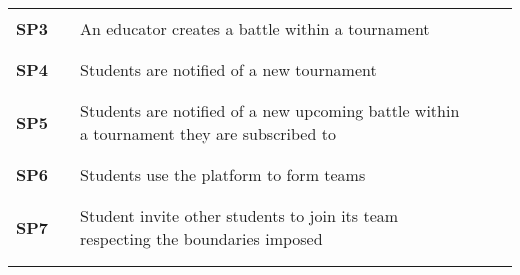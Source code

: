 \begin{longtable}[H]{l l p{8.5cm} l l}
                  &        &                                                                                                          &        &                        \\\hline & & & & \\
    \textbf{SP3}  & \vline & An educator creates a battle within a tournament                                                         & \vline &                        \\
                  &        &                                                                                                          &        &                        \\\hline & & & & \\
    \textbf{SP4}  & \vline & Students are notified of a new tournament                                                                & \vline &                        \\
                  &        &                                                                                                          &        &                        \\\hline & & & & \\
    \textbf{SP5}  & \vline & Students are notified of a new upcoming battle within a tournament they are subscribed to                & \vline &                        \\
                  &        &                                                                                                          &        &                        \\\hline & & & & \\
    \textbf{SP6}  & \vline & Students use the platform to form teams                                                                  & \vline &                        \\
                  &        &                                                                                                          &        &                        \\\hline & & & & \\
    \textbf{SP7}  & \vline & Student invite other students to join its team respecting the boundaries imposed                         & \vline &                        \\
                  &        &                                                                                                          &        &                        \\\hline & & & & \\

\end{longtable}
